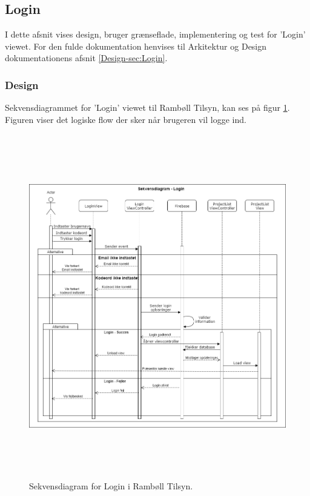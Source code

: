 \subsection{Login}
I dette afsnit vises design, bruger grænseflade, implementering og test for 'Login' viewet. For den fulde dokumentation henvises til Arkitektur og Design dokumentationens afsnit \ref{Design-sec:Login}.
\subsubsection{Design}
Sekvensdiagrammet for 'Login' viewet til Rambøll Tilsyn, kan ses på figur \ref{fig:LoginSekvens}. Figuren viser det logiske flow der sker når brugeren vil logge ind.
\begin{figure}[H] %
	\centering
	\includegraphics[height=15cm, width=15cm]{Design/Applikation/Login/LoginSekvensDiagram}
	\caption{Sekvensdiagram for Login i Rambøll Tilsyn.}
	\label{fig:LoginSekvens}
\end{figure}

\clearpage


